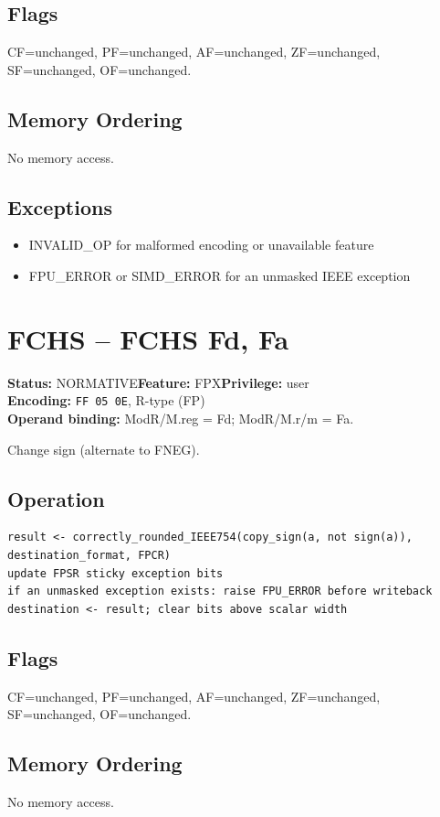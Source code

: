 \documentclass[10pt]{article}
\begin{document}
\subsection*{Flags}
CF=unchanged, PF=unchanged, AF=unchanged, ZF=unchanged, SF=unchanged, OF=unchanged.
\subsection*{Memory Ordering}
No memory access.
\subsection*{Exceptions}
\begin{itemize}
\item INVALID\_OP for malformed encoding or unavailable feature
\item FPU\_ERROR or SIMD\_ERROR for an unmasked IEEE exception
\end{itemize}
\clearpage

\section{FCHS -- FCHS Fd, Fa}
\textbf{Status:} NORMATIVE\quad \textbf{Feature:} FPX\quad \textbf{Privilege:} user\\
\textbf{Encoding:} \texttt{FF 05 0E}, R-type (FP)\\
\textbf{Operand binding:} ModR/M.reg = Fd; ModR/M.r/m = Fa.

Change sign (alternate to FNEG).

\subsection*{Operation}
\begin{lstlisting}
result <- correctly_rounded_IEEE754(copy_sign(a, not sign(a)), destination_format, FPCR)
update FPSR sticky exception bits
if an unmasked exception exists: raise FPU_ERROR before writeback
destination <- result; clear bits above scalar width
\end{lstlisting}
\subsection*{Flags}
CF=unchanged, PF=unchanged, AF=unchanged, ZF=unchanged, SF=unchanged, OF=unchanged.
\subsection*{Memory Ordering}
No memory access.
\end{document}
